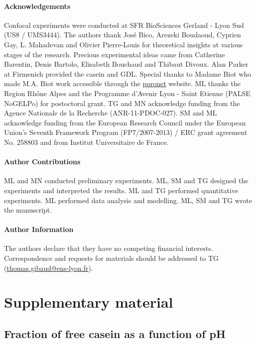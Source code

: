 \documentclass[twocolumn,superscriptaddress,showpacs,preprintnumbers,
amsmath,amssymb,prl]{revtex4-1}
\begin{document}
\paragraph*{Acknowledgements}
Confocal experiments were conducted at SFR BioSciences Gerland - Lyon Sud (US8 / UMS3444).
The authors thank Jos\'e Bico, Arezeki Boudaoud, Cyprien Gay, L. Mahadevan and Olivier Pierre-Louis for theoretical insights at various stages of the research. 
Precious experimental ideas came from Catherine Barentin, Denis Bartolo, Elisabeth Bouchaud and Thibaut Divoux.
Alan Parker at Firmenich provided the casein and GDL. 
Special thanks to Madame Biot who made M.A. Biot work accessible through the \href{http://www.olemiss.edu/sciencenet/poronet/}{poronet} website. 
ML thanks the Region Rhône Alpes and the Programme d'Avenir Lyon - Saint Etienne (PALSE NoGELPo) for postoctoral grant. 
TG and MN acknowledge funding from the Agence Nationale de la Recherche (ANR-11-PDOC-027). 
SM and ML acknowledge funding from the European Research Council under the European Union's Seventh Framework Program (FP7/2007-2013) / ERC grant agreement No. 258803 and from Institut Universitaire de France.


\paragraph*{Author Contributions}
ML and MN conducted preliminary experiments. ML, SM and TG designed the experiments and interpreted the results. ML and TG performed quantitative experiments. ML performed data analysis and modelling. ML, SM and TG wrote the manuscript.


\paragraph*{Author Information} 
The authors declare that they have no competing financial interests. 
Correspondence and requests for materials should be addressed to TG (\href{mailto:thomas.gibaud@ens-lyon.fr}{thomas.gibaud@ens-lyon.fr}).






\clearpage
\newpage
\setcounter{figure}{0}

\section*{Supplementary material}


\subsection*{Fraction of free casein as a function of pH}
\end{document}
